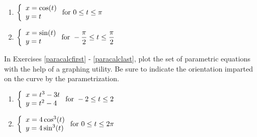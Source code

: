 \begin{multicols}{2} \raggedcolumns 
\begin{enumerate}
\setcounter{enumi}{\value{HW}}

\item ${\displaystyle \left\{ \begin{array}{l} x = \cos(t) \\ y = t \end{array} \right. \vspace{.25in} \mbox{for } 0 \leq t \leq \pi}$
\item ${\displaystyle \left\{ \begin{array}{l} x = \sin(t) \\ y = t \end{array} \right. \vspace{.25in} \mbox{for } -\dfrac{\pi}{2} \leq t \leq \dfrac{\pi}{2}}$ \label{paraplotlast}

\setcounter{HW}{\value{enumi}}
\end{enumerate}
\end{multicols}

In Exercises \ref{paracalcfirst} - \ref{paracalclast}, plot the set of parametric equations with the help of a graphing utility.  Be sure to indicate the orientation imparted on the curve by the parametrization.  

\begin{multicols}{2} \raggedcolumns 
\begin{enumerate}
\setcounter{enumi}{\value{HW}}


\item ${\displaystyle \left\{ \begin{array}{l} x = t^{3} - 3t \\ y = t^{2} - 4 \end{array} \right. \vspace{.25in} \mbox{for } -2 \leq t \leq 2}$ \label{paracalcfirst}
\item ${\displaystyle \left\{ \begin{array}{l} x = 4\cos^{3}(t) \\ y = 4\sin^{3}(t) \end{array} \right. \vspace{.25in} \mbox{for } 0 \leq t \leq 2\pi}$

\setcounter{HW}{\value{enumi}}
\end{enumerate}
\end{multicols}

